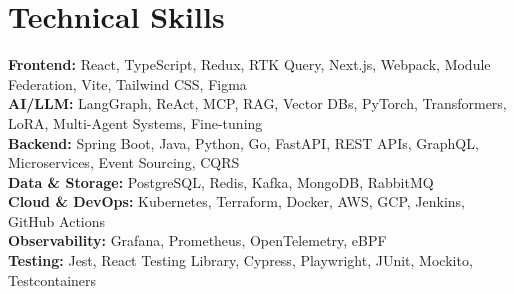 \documentclass[letterpaper,11pt]{article}
\begin{document}
\section{Technical Skills}
\vspace{-7pt}
\begin{itemize}[leftmargin=0.15in, label={}]\small{\item{
\textbf{Frontend:}{ React, TypeScript, Redux, RTK Query, Next.js, Webpack, Module Federation, Vite, Tailwind CSS, Figma} \\
\textbf{AI/LLM:}{ LangGraph, ReAct, MCP, RAG, Vector DBs, PyTorch, Transformers, LoRA, Multi-Agent Systems, Fine-tuning} \\
\textbf{Backend:}{ Spring Boot, Java, Python, Go, FastAPI, REST APIs, GraphQL, Microservices, Event Sourcing, CQRS} \\
\textbf{Data \& Storage:}{ PostgreSQL, Redis, Kafka, MongoDB, RabbitMQ} \\
\textbf{Cloud \& DevOps:}{ Kubernetes, Terraform, Docker, AWS, GCP, Jenkins, GitHub Actions} \\
\textbf{Observability:}{ Grafana, Prometheus, OpenTelemetry, eBPF} \\
\textbf{Testing:}{ Jest, React Testing Library, Cypress, Playwright, JUnit, Mockito, Testcontainers}
}}
\end{itemize}
\end{document}
